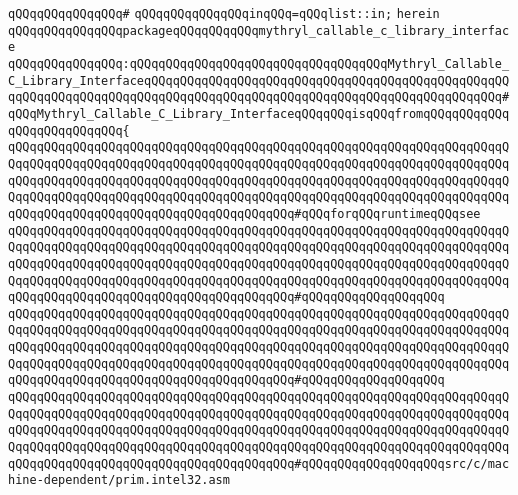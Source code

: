 \verb|qQQqqQQqqQQqqQQq#|\newline
\verb|qQQqqQQqqQQqqQQqinqQQq=qQQqlist::in;|\newline
\verb|herein|\newline
\verb|qQQqqQQqqQQqqQQqpackageqQQqqQQqqQQqmythryl_callable_c_library_interface|\newline
\verb|qQQqqQQqqQQqqQQq:qQQqqQQqqQQqqQQqqQQqqQQqqQQqqQQqqQQqMythryl_Callable_C_Library_InterfaceqQQqqQQqqQQqqQQqqQQqqQQqqQQqqQQqqQQqqQQqqQQqqQQqqQQqqQQqqQQqqQQqqQQqqQQqqQQqqQQqqQQqqQQqqQQqqQQqqQQqqQQqqQQqqQQqqQQqqQQq#qQQqMythryl_Callable_C_Library_InterfaceqQQqqQQqisqQQqfromqQQqqQQqqQQq|\newline
\verb|qQQqqQQqqQQqqQQq{|\newline
\newline
\verb|qQQqqQQqqQQqqQQqqQQqqQQqqQQqqQQqqQQqqQQqqQQqqQQqqQQqqQQqqQQqqQQqqQQqqQQqqQQqqQQqqQQqqQQqqQQqqQQqqQQqqQQqqQQqqQQqqQQqqQQqqQQqqQQqqQQqqQQqqQQqqQQqqQQqqQQqqQQqqQQqqQQqqQQqqQQqqQQqqQQqqQQqqQQqqQQqqQQqqQQqqQQqqQQqqQQqqQQqqQQqqQQqqQQqqQQqqQQqqQQqqQQqqQQqqQQqqQQqqQQqqQQqqQQqqQQqqQQqqQQqqQQqqQQqqQQqqQQqqQQqqQQqqQQqqQQqqQQqqQQq#qQQqforqQQqruntimeqQQqsee|\newline
\verb|qQQqqQQqqQQqqQQqqQQqqQQqqQQqqQQqqQQqqQQqqQQqqQQqqQQqqQQqqQQqqQQqqQQqqQQqqQQqqQQqqQQqqQQqqQQqqQQqqQQqqQQqqQQqqQQqqQQqqQQqqQQqqQQqqQQqqQQqqQQqqQQqqQQqqQQqqQQqqQQqqQQqqQQqqQQqqQQqqQQqqQQqqQQqqQQqqQQqqQQqqQQqqQQqqQQqqQQqqQQqqQQqqQQqqQQqqQQqqQQqqQQqqQQqqQQqqQQqqQQqqQQqqQQqqQQqqQQqqQQqqQQqqQQqqQQqqQQqqQQqqQQqqQQqqQQqqQQqqQQq#qQQqqQQqqQQqqQQqqQQq|\newline
\verb|qQQqqQQqqQQqqQQqqQQqqQQqqQQqqQQqqQQqqQQqqQQqqQQqqQQqqQQqqQQqqQQqqQQqqQQqqQQqqQQqqQQqqQQqqQQqqQQqqQQqqQQqqQQqqQQqqQQqqQQqqQQqqQQqqQQqqQQqqQQqqQQqqQQqqQQqqQQqqQQqqQQqqQQqqQQqqQQqqQQqqQQqqQQqqQQqqQQqqQQqqQQqqQQqqQQqqQQqqQQqqQQqqQQqqQQqqQQqqQQqqQQqqQQqqQQqqQQqqQQqqQQqqQQqqQQqqQQqqQQqqQQqqQQqqQQqqQQqqQQqqQQqqQQqqQQqqQQqqQQq#qQQqqQQqqQQqqQQqqQQq|\newline
\verb|qQQqqQQqqQQqqQQqqQQqqQQqqQQqqQQqqQQqqQQqqQQqqQQqqQQqqQQqqQQqqQQqqQQqqQQqqQQqqQQqqQQqqQQqqQQqqQQqqQQqqQQqqQQqqQQqqQQqqQQqqQQqqQQqqQQqqQQqqQQqqQQqqQQqqQQqqQQqqQQqqQQqqQQqqQQqqQQqqQQqqQQqqQQqqQQqqQQqqQQqqQQqqQQqqQQqqQQqqQQqqQQqqQQqqQQqqQQqqQQqqQQqqQQqqQQqqQQqqQQqqQQqqQQqqQQqqQQqqQQqqQQqqQQqqQQqqQQqqQQqqQQqqQQqqQQqqQQqqQQq#qQQqqQQqqQQqqQQqqQQqsrc/c/machine-dependent/prim.intel32.asm|\newline
